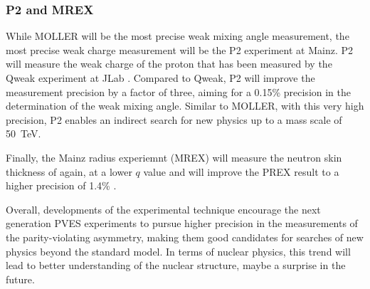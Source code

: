 \subsubsection{P2 and MREX}
While MOLLER will be the most precise weak mixing angle measurement, the most
precise weak charge measurement will be the P2 experiment at Mainz.
P2 will measure the weak charge of the proton 
that has been measured by the Qweak experiment at JLab \cite{PhysRevLett.111.141803}.
Compared to Qweak, P2 will improve the measurement precision by a factor of three,
aiming for a 0.15\% precision in the determination of the weak mixing angle.
Similar to MOLLER, with this very high precision, P2 enables an indirect search 
for new physics up to a mass scale of 50~TeV.

Finally, the Mainz radius experiemnt (MREX) will measure the neutron skin thickness of \Pb
again, at a lower $q$ value and will improve the PREX result to a higher precision
of 1.4\% \cite{Becker2018}.

\bigskip
Overall, developments of the experimental technique encourage the next 
generation PVES experiments to pursue higher precision in the measurements of
the parity-violating asymmetry, making them good candidates for searches of new 
physics beyond the standard model. In terms of nuclear physics, this trend 
will lead to better understanding of the nuclear structure, maybe a surprise
in the future.


